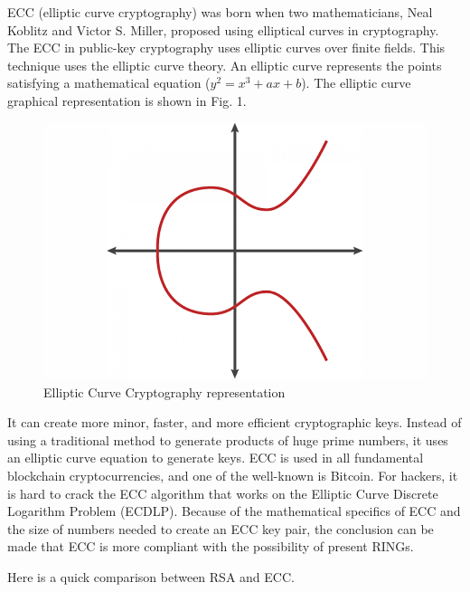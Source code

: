\documentclass[runningheads]{llncs}
\begin{document}
ECC (elliptic curve cryptography) was born when two mathematicians, Neal Koblitz and Victor S. Miller, proposed using elliptical curves in cryptography. The ECC in public-key cryptography uses elliptic curves over finite fields. This technique uses the elliptic curve theory. An elliptic curve represents the points satisfying a mathematical equation ($y^2 = x^3 + ax + b$). The elliptic curve graphical representation is shown in Fig. 1.

\begin{figure}[h]
\includegraphics[width=\textwidth,height=0.5\textwidth]{fig01}
\caption{Elliptic Curve Cryptography representation}
\label{fig:01}
\end{figure}

It can create more minor, faster, and more efficient cryptographic keys. Instead of using a traditional method to generate products of huge prime numbers, it uses an elliptic curve equation to generate keys. ECC is used in all fundamental blockchain cryptocurrencies, and one of the well-known is Bitcoin. For hackers, it is hard to crack the ECC algorithm that works on the Elliptic Curve Discrete Logarithm Problem (ECDLP). Because of the mathematical specifics of ECC and the size of numbers needed to create an ECC key pair, the conclusion can be made that ECC is more compliant with the possibility of present RINGs.

Here is a quick comparison between RSA and ECC.
\end{document}
